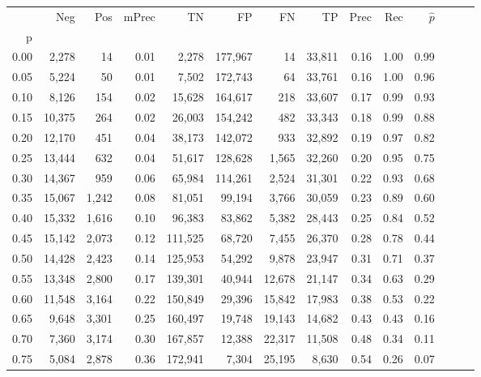 \begin{tabular}{rrrrrrrrrrrrrr}
\toprule
{} &     Neg &    Pos & mPrec &       TN &       FP &      FN &      TP &  Prec &   Rec & $\hat{p}$ \\
p    &         &        &       &          &          &         &         &       &       &           \\
\midrule
0.00 &   2,278 &     14 &  0.01 &    2,278 &  177,967 &      14 &  33,811 &  0.16 &  1.00 &      0.99 \\
0.05 &   5,224 &     50 &  0.01 &    7,502 &  172,743 &      64 &  33,761 &  0.16 &  1.00 &      0.96 \\
0.10 &   8,126 &    154 &  0.02 &   15,628 &  164,617 &     218 &  33,607 &  0.17 &  0.99 &      0.93 \\
0.15 &  10,375 &    264 &  0.02 &   26,003 &  154,242 &     482 &  33,343 &  0.18 &  0.99 &      0.88 \\
0.20 &  12,170 &    451 &  0.04 &   38,173 &  142,072 &     933 &  32,892 &  0.19 &  0.97 &      0.82 \\
0.25 &  13,444 &    632 &  0.04 &   51,617 &  128,628 &   1,565 &  32,260 &  0.20 &  0.95 &      0.75 \\
0.30 &  14,367 &    959 &  0.06 &   65,984 &  114,261 &   2,524 &  31,301 &  0.22 &  0.93 &      0.68 \\
0.35 &  15,067 &  1,242 &  0.08 &   81,051 &   99,194 &   3,766 &  30,059 &  0.23 &  0.89 &      0.60 \\
0.40 &  15,332 &  1,616 &  0.10 &   96,383 &   83,862 &   5,382 &  28,443 &  0.25 &  0.84 &      0.52 \\
0.45 &  15,142 &  2,073 &  0.12 &  111,525 &   68,720 &   7,455 &  26,370 &  0.28 &  0.78 &      0.44 \\
0.50 &  14,428 &  2,423 &  0.14 &  125,953 &   54,292 &   9,878 &  23,947 &  0.31 &  0.71 &      0.37 \\
0.55 &  13,348 &  2,800 &  0.17 &  139,301 &   40,944 &  12,678 &  21,147 &  0.34 &  0.63 &      0.29 \\
0.60 &  11,548 &  3,164 &  0.22 &  150,849 &   29,396 &  15,842 &  17,983 &  0.38 &  0.53 &      0.22 \\
0.65 &   9,648 &  3,301 &  0.25 &  160,497 &   19,748 &  19,143 &  14,682 &  0.43 &  0.43 &      0.16 \\
0.70 &   7,360 &  3,174 &  0.30 &  167,857 &   12,388 &  22,317 &  11,508 &  0.48 &  0.34 &      0.11 \\
0.75 &   5,084 &  2,878 &  0.36 &  172,941 &    7,304 &  25,195 &   8,630 &  0.54 &  0.26 &      0.07 \\

\end{tabular}
